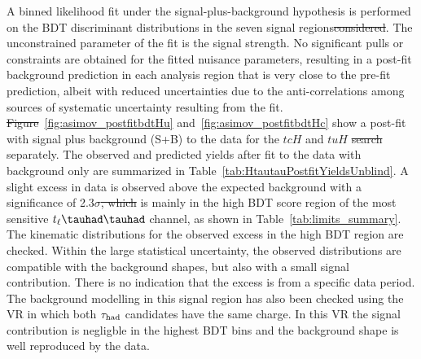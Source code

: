 \documentclass[PAPER, coverpage, atlasdraft=true, texlive=2016, UKenglish]{\ATLASLATEXPATH atlasdoc}
\providecommand{\DIFadd}[1]{{\protect\color{blue}\uwave{#1}}} %
\providecommand{\DIFdel}[1]{{\protect\color{red}\sout{#1}}}                      %
\providecommand{\DIFaddbegin}{} %
\providecommand{\DIFaddend}{} %
\providecommand{\DIFdelbegin}{} %
\providecommand{\DIFdelend}{} %
\begin{document}
A binned likelihood fit under the signal-plus-background hypothesis is performed on the BDT discriminant distributions in the seven 
signal regions\DIFdelbegin \DIFdel{considered}\DIFdelend . The unconstrained parameter of the fit is the signal strength.
No significant pulls or constraints are obtained for the fitted nuisance parameters, resulting in a post-fit background prediction in each analysis region that is
very close to the pre-fit prediction, albeit with reduced uncertainties due to the anti-correlations among sources of systematic uncertainty resulting from the fit.
\DIFdelbegin \DIFdel{Figure}\DIFdelend \DIFaddbegin \DIFadd{Figures}\DIFaddend ~\ref{fig:asimov_postfitbdtHu} and~\ref{fig:asimov_postfitbdtHc} show a post-fit with signal plus background (S+B) to the data for
the $tcH$ and $tuH$ \DIFdelbegin \DIFdel{search }\DIFdelend \DIFaddbegin \DIFadd{searches }\DIFaddend separately.
The observed and predicted yields after \DIFaddbegin \DIFadd{the }\DIFaddend fit to the data with background only are summarized in Table~\ref{tab:HtautauPostfitYieldsUnblind}.
A slight excess in \DIFaddbegin \DIFadd{the }\DIFaddend data is observed above the expected background with a significance of 2.3$\sigma$\DIFdelbegin \DIFdel{, which }\DIFdelend \DIFaddbegin \DIFadd{. This }\DIFaddend is mainly in the high BDT score region of the most sensitive $t_{\ell}\thadhad$ channel, as shown in
Table~\ref{tab:limits_summary}.
The kinematic distributions for the observed excess in
the high BDT region are checked. Within the large statistical uncertainty, the observed distributions are compatible with the background shapes, but also with a small signal contribution. There is no indication that the excess is from a specific data period.
The background modelling in this signal region has also been checked using the VR in which both $\tau_\text{had}$ candidates have the same charge.
In this VR the signal contribution is negligble in the highest BDT bins and the background shape is well reproduced by the data.
\end{document}
